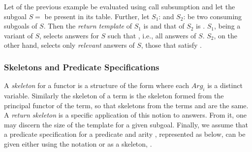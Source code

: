 \begin{example}
Let  of the previous example be evaluated using call
subsumption and let the subgoal $S =$  be present in
its table.  Further, let $S_1$:  and $S_2$:
 be two consuming subgoals of $S$\@.  Then the
\emph{return template} of $S_1$ is  and that of $S_2$
is .  $S_1$, being a variant of $S$, selects answers
for $S$ such that \@, i.e., all answers of $S$.
$S_2$, on the other hand, selects only \emph{relevant} answers of $S$,
those that satisfy .\fillBox
\end{example}


\subsubsection*{Skeletons and Predicate Specifications}


A \emph{skeleton} for a functor  is a structure of the form
 where each $Arg_i$ is a distinct
variable.  Similarly the skeleton of a term is the skeleton formed
from the principal functor of the term, so that skeletons from the
terms  and  are the same.  A \emph{return
  skeleton} is a specific application of this notion to answers.  From
it, one may discern the size of the template for a given subgoal.
Finally, we assume that a predicate specification for a predicate
 and arity , represented as  below, can
be given either using the notation  or as a skeleton,
.


